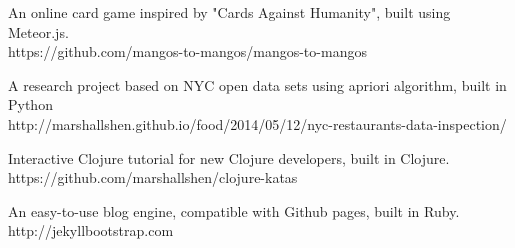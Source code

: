 \begin{resume}
\begin{position}
An online card game inspired by "Cards Against Humanity", built using Meteor.js. \\
https://github.com/mangos-to-mangos/mangos-to-mangos
\end{position}

\begin{position}
A research project based on NYC open data sets using apriori algorithm, built in Python \\
http://marshallshen.github.io/food/2014/05/12/nyc-restaurants-data-inspection/
\end{position}

\begin{position}
Interactive Clojure tutorial for new Clojure developers, built in Clojure. \\
https://github.com/marshallshen/clojure-katas
\end{position}

\begin{position}
An easy-to-use blog engine, compatible with Github pages, built in Ruby. \\
http://jekyllbootstrap.com
\end{position}










\end{resume}
